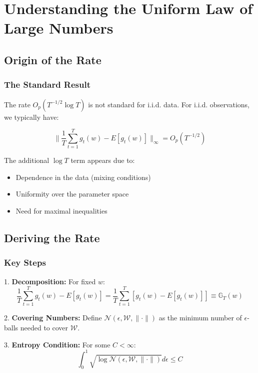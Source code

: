 \documentclass[12pt,article]{memoir}
\begin{document}
\section{Understanding the Uniform Law of Large Numbers}

\subsection{Origin of the Rate}

\subsubsection{The Standard Result}

The rate $O_p(T^{-1/2}\log T)$ is not standard for i.i.d. data. For i.i.d. observations, we typically have:

\begin{equation}
    \|\frac{1}{T}\sum_{t=1}^T g_t(w) - E[g_t(w)]\|_{\infty} = O_p(T^{-1/2})
\end{equation}

The additional $\log T$ term appears due to:
\begin{itemize}
    \item Dependence in the data (mixing conditions)
    \item Uniformity over the parameter space
    \item Need for maximal inequalities
\end{itemize}

\subsection{Deriving the Rate}

\subsubsection{Key Steps}

1. \textbf{Decomposition:}
For fixed $w$:
\begin{equation}
    \frac{1}{T}\sum_{t=1}^T g_t(w) - E[g_t(w)] = \frac{1}{T}\sum_{t=1}^T [g_t(w) - E[g_t(w)]] \equiv \mathbb{G}_T(w)
\end{equation}

2. \textbf{Covering Numbers:}
Define $\mathcal{N}(\epsilon, \mathcal{W}, \|\cdot\|)$ as the minimum number of $\epsilon$-balls needed to cover $\mathcal{W}$.

3. \textbf{Entropy Condition:}
For some $C < \infty$:
\begin{equation}
    \int_0^1 \sqrt{\log \mathcal{N}(\epsilon, \mathcal{W}, \|\cdot\|)}d\epsilon \leq C
\end{equation}
\end{document}

